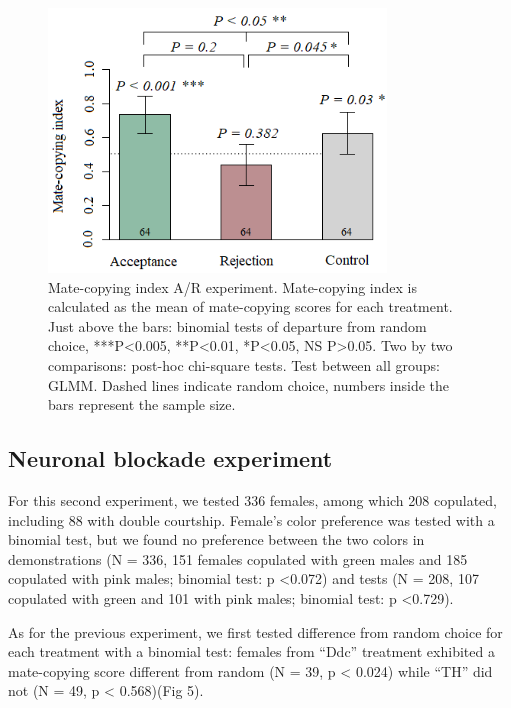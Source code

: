 \documentclass[a4paper, 12pt]{article}
\begin{document}
	\clearpage
		\begin{figure}
		\centering
		\includegraphics[width=0.8\textwidth]{images/mcsar}
		\caption{Mate-copying index A/R experiment. Mate-copying index is calculated as the mean of mate-copying scores for each treatment. Just above the bars: binomial tests of departure from random choice, ***P<0.005, **P<0.01, *P<0.05, NS P>0.05. Two by two comparisons: post-hoc chi-square tests. Test between all groups: GLMM. Dashed lines indicate random choice, numbers inside the bars represent the sample size.}
		\label{fig:mcsar}
	\end{figure}
\clearpage

\subsection{Neuronal blockade experiment}

For this second experiment, we tested 336 females, among which 208 copulated, including 88 with double courtship. Female's color preference was tested with a binomial test, but we found no preference between the two colors in demonstrations (N = 336, 151 females copulated with green males and 185 copulated with pink males; binomial test: p {\textless}0.072) and tests (N = 208, 107 copulated with green and 101 with pink males; binomial test: p {\textless}0.729).

As for the previous experiment, we first tested difference from random choice for each treatment with a binomial test: females from ``Ddc'' treatment exhibited a mate-copying score different from random (N = 39, p {\textless} 0.024) while ``TH'' did not (N = 49, p {\textless} 0.568)(Fig 5).
\end{document}
